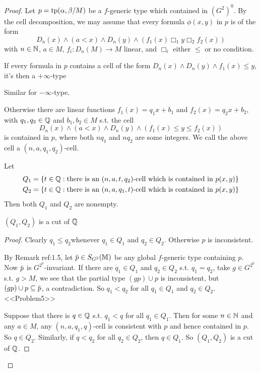 \documentclass[11pt]{article}
\begin{document}
\begin{proof}
Let \(p=\operatorname{tp}(\alpha,\beta/M)\) be a \(f\)-generic type which contained in \((G^2)^0\). By the cell
decomposition, we may assume that every formula \(\phi(x,y)\) in \(p\) is of the form
\begin{equation*}
D_n(x)\wedge(a<x)\wedge D_n(y)\wedge(f_1(x)\Box_1y\Box_2f_2(x))
\end{equation*}
with \(n\in\mathbb{N}\), \(a\in M\), \(f_i:D_n(M)\to M\) linear, and \(\Box_i\) either \(\le\) or no condition.

If every formula in \(p\) contains a cell of the form \(D_n(x)\wedge D_n(y)\wedge f_1(x)\le y\), it's then
a \(+\infty\)-type

Similar for \(-\infty\)-type.

Otherwise there are linear functions \(f_1(x)=q_1x+b_1\) and \(f_2(x)=q_2x+b_2\), with \(q_1,q_2\in\mathbb{Q}\)
and \(b_1,b_2\in M\) s.t. the cell
\begin{equation*}
D_n(x)\wedge(a<x)\wedge D_n(y)\wedge(f_1(x)\le y\le f_2(x))
\end{equation*}
is contained in \(p\), where both \(nq_1\) and \(nq_2\) are some integers. We call the above cell
a \((n,a,q_1,q_2)\)-cell.

Let
\begin{align*}
&Q_1=\{t\in\mathbb{Q}:\text{there is an \((n,a,t,q_2)\)-cell which is contained in \(p(x,y)\)}\}\\
&Q_2=\{t\in\mathbb{Q}:\text{there is an \((n,a,q_1,t)\)-cell which is contained in }p(x,y)\}
\end{align*}
Then both \(Q_1\) and \(Q_2\) are nonempty.

\begin{claim}
\((Q_1,Q_2)\) is a cut of \(\mathbb{Q}\)
\end{claim}

\begin{proof}
Clearly \(q_1\le q_2\)whenever \(q_1\in Q_1\) and \(q_2\in Q_2\). Otherwise \(p\) is inconsistent.

By Remark ref:1.5, let \(\barp\in S_{G^2}(\M)\) be any global \(f\)-generic type containing \(p\). Now \(\barp\) is \(G^{2^0}\)-invariant.
If there are \(q_1\in Q_1\) and \(q_2\in Q_2\) s.t. \(q_1=q_2\), take \(g\in G^{2^0}\) s.t. \(g>M\), we see that the partial type \((gp)\cup p\) is
 inconsistent, but \((gp)\cup p\subseteq\barp\), a contradiction. So \(q_1<q_2\) for all \(q_1\in Q_1\) and \(q_2\in Q_2\). <<Problem5>>

Suppose that there is \(q\in\mathbb{Q}\) s.t. \(q_1<q\) for all \(q_1\in Q_1\). Then for some \(n\in\mathbb{N}\) and any \(a\in M\), any \((n,a,q_1,q)\)-cell
is consistent with \(p\) and hence contained in \(p\). So \(q\in Q_2\). Similarly, if \(q<q_2\) for all \(q_2\in Q_2\), then \(q\in Q_1\).
So \((Q_1,Q_2)\) is a cut of \(\mathbb{Q}\).
\end{proof}


\end{proof}
\end{document}
